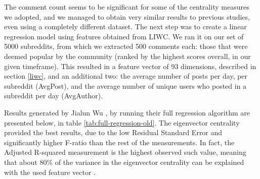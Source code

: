 \documentclass[bsc,frontabs,twoside,singlespacing,parskip,deptreport]{infthesis}
\begin{document}
The comment count seems to be significant for some of the centrality measures we adopted, and we managed to obtain very similar results to previous studies, even using a completely different dataset. The next step was to create a linear regression model using features obtained from LIWC. We ran it on our set of 5000 subreddits, from which we extracted 500 comments each: those that were deemed popular by the community (ranked by the highest scores overall, in our given timeframe). This resulted in a feature vector of 93 dimensions, described in section \ref{liwc}, and an additional two: the average number of posts per day, per subreddit (AvgPost), and the average number of unique users who posted in a subreddit per day (AvgAuthor).

Results generated by Jialun Wu \cite{masters}, by running their full regression algorithm are presented below, in table \ref{tab:full-regression-old}. The eigenvector centrality provided the best results, due to the low Residual Standard Error and significantly higher F-ratio than the rest of the measurements. In fact, the Adjusted R-squared measurement is the highest observed such value, meaning that about 80\% of the variance in the eigenvector centrality can be explained with the used feature vector \cite{masters}. 

\begin{table}[!h]
\centering
{}
\caption{Results for full regression on the limited dataset}
\label{tab:full-regression-old}
\end{table}
\end{document}
